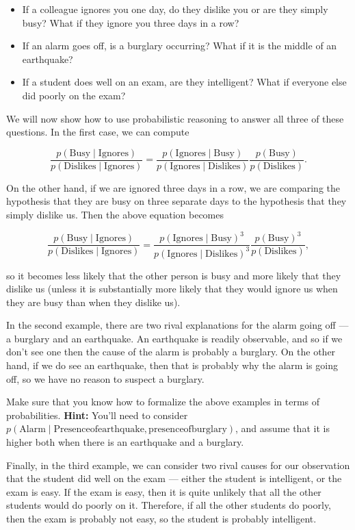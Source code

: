 \documentclass[11pt]{article}
\begin{document}
\begin{itemize}
 \item If a colleague ignores you one day, do they dislike you or are they simply busy? What if they ignore you three days in a row?
 \item If an alarm goes off, is a burglary occurring? What if it is the middle of an earthquake?
 \item If a student does well on an exam, are they intelligent? What if everyone else did poorly on the exam?
\end{itemize}

We will now show how to use probabilistic reasoning to answer all three of these questions. In the first case, we can compute

\[ \frac{p(\mathrm{Busy} \mid \mathrm{Ignores})}{p(\mathrm{Dislikes} \mid \mathrm{Ignores})} = \frac{p(\mathrm{Ignores} \mid \mathrm{Busy})}{p(\mathrm{Ignores} \mid \mathrm{Dislikes})} \frac{p(\mathrm{Busy})}{p(\mathrm{Dislikes})}. \]

On the other hand, if we are ignored three days in a row, we are comparing the hypothesis that they are busy on three separate days to the hypothesis that they simply dislike us. Then the above equation becomes

\[ \frac{p(\mathrm{Busy} \mid \mathrm{Ignores})}{p(\mathrm{Dislikes} \mid \mathrm{Ignores})} = \frac{p(\mathrm{Ignores} \mid \mathrm{Busy})^3}{p(\mathrm{Ignores} \mid \mathrm{Dislikes})^3} \frac{p(\mathrm{Busy})^3}{p(\mathrm{Dislikes})}, \]

so it becomes less likely that the other person is busy and more likely that they dislike us (unless it is substantially more likely that they would ignore us when they are busy than when they dislike us).

In the second example, there are two rival explanations for the alarm going off --- a burglary and an earthquake. An earthquake is readily observable, and so if we don't see one then the cause of the alarm is probably a burglary. On the other hand, if we do see an earthquake, then that is probably why the alarm is going off, so we have no reason to suspect a burglary.

Make sure that you know how to formalize the above examples in terms of probabilities. \textbf{Hint:} You'll need to consider $p(\mathrm{Alarm} \mid \mathrm{Presence of earthquake, presence of burglary})$, and assume that it is higher both when there is an earthquake and a burglary.

Finally, in the third example, we can consider two rival causes for our observation that the student did well on the exam --- either the student is intelligent, or the exam is easy. If the exam is easy, then it is quite unlikely that all the other students would do poorly on it. Therefore, if all the other students do poorly, then the exam is probably not easy, so the student is probably intelligent.
\end{document}
